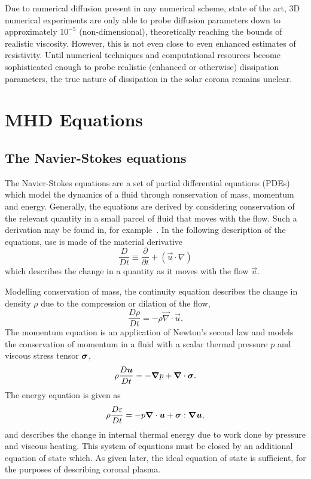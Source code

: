 Due to numerical diffusion present in any numerical scheme, state of the art, 3D numerical experiments are only able to probe diffusion parameters down to approximately $10^{-5}$ (non-dimensional), theoretically reaching the bounds of realistic viscosity. However, this is not even close to even enhanced estimates of resistivity. Until numerical techniques and computational resources become sophisticated enough to probe realistic (enhanced or otherwise) dissipation parameters, the true nature of dissipation in the solar corona remains unclear.

\section{MHD Equations}

\subsection{The Navier-Stokes equations}

The Navier-Stokes equations are a set of partial differential equations (PDEs) which model the dynamics of a fluid through conservation of mass, momentum and energy. Generally, the equations are derived by considering conservation of the relevant quantity in a small parcel of fluid that moves with the flow. Such a derivation may be found in, for example~\cite{andersonComputationalFluidDynamics1995}. In the following description of the equations, use is made of the material derivative
\begin{equation}
  \label{eq:material_derivative}
  \frac{D}{Dt} \equiv \frac{\partial}{\partial t} + (\vec{u} \cdot \nabla)
\end{equation}
which describes the change in a quantity as it moves with the flow $\vec{u}$.

Modelling conservation of mass, the continuity equation describes the change in density $\rho$ due to the compression or dilation of the flow,
\begin{equation}
\frac{D\rho}{Dt} = - \rho \vec{\nabla} \cdot \vec{u}.
\label{eq:ns_continuity}
\end{equation}
The momentum equation is an application of Newton's second law and models the conservation of momentum in a fluid with a scalar thermal pressure $p$ and viscous stress tensor ${\bm \sigma}$,
\begin{equation}
\rho\frac{D{\bm u}}{Dt} = -{\bm \nabla} p + {\bm \nabla} \cdot {\bm \sigma}.
\label{eq:ns_momentum}
\end{equation}
The energy equation is given as
\begin{equation}
\rho\frac{D\varepsilon}{Dt} = -p {\bm \nabla} \cdot {\bm u} + {\bm \sigma} : {\bm \nabla}{\bm u},
\label{eq:ns_energy}
\end{equation}
and describes the change in internal thermal energy due to work done by pressure and viscous heating. This system of equations must be closed by an additional equation of state which. As given later, the ideal equation of state is sufficient, for the purposes of describing coronal plasma.

